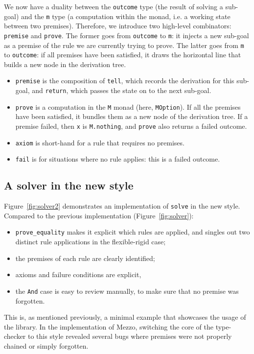 \documentclass{easychair}
\def\li{\lstinline}
\newcommand{\fref}[1]{Figure~\ref{fig:#1}}
\begin{document}
We now have a duality between the \li+outcome+ type (the result of solving a
sub-goal) and the \li+m+ type (a computation within the monad, i.e. a working
state between two premises). Therefore, we introduce two high-level combinators:
\li+premise+ and \li+prove+. The former goes from \li+outcome+ to \li+m+: it
injects a new sub-goal as a premise of the rule we are currently trying to
prove. The latter goes from \li+m+ to \li+outcome+: if all premises have been
satisfied, it draws the horizontal line that builds a new node in the derivation
tree.

\begin{itemize}

  \item \li+premise+ is the composition of \li+tell+, which records the
    derivation for this sub-goal, and \li+return+, which passes the state on to
    the next sub-goal.

  \item \li+prove+ is a computation in the \li+M+ monad (here, \li+MOption+). If
    all the premises have been satisfied, it bundles them as a new node of the
    derivation tree. If a premise failed, then \li+x+ is \li+M.nothing+, and
    \li+prove+ also returns a failed outcome.

  \item \li+axiom+ is short-hand for a rule that requires no premises.

  \item \li+fail+ is for situations where no rule applies: this is a failed outcome.
\end{itemize}

\subsection{A solver in the new style}

\fref{solver2} demonstrates an implementation of \li+solve+ in the new style.
Compared to the previous implementation (\fref{solver}):
\begin{itemize}
  \item \li+prove_equality+ makes it explicit which rules are applied, and
    singles out two distinct rule applications in the flexible-rigid case;
  \item the premises of each rule are clearly identified;
  \item axioms and failure conditions are explicit,
  \item the \li+And+ case is easy to review manually, to make sure that no
    premise was forgotten.
\end{itemize}
This is, as mentioned previously, a minimal example that showcases the usage of
the library. In the implementation of Mezzo, switching the core of the
type-checker to this style revealed several bugs where premises were not
properly chained or simply forgotten.
\end{document}
